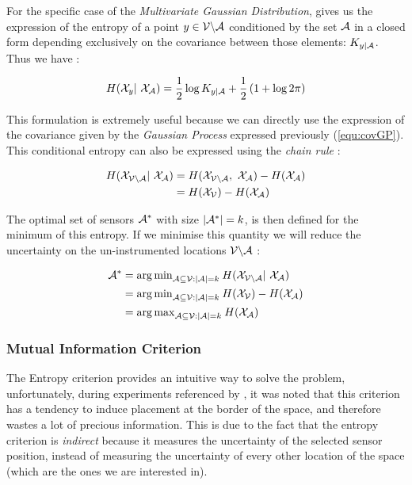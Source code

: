 For the specific case of the \textit{Multivariate Gaussian Distribution}, \citet{krause_near-optimal_2008} gives us the expression of the entropy of a point $y \in \mathcal{V} \backslash\mathcal{A}$ conditioned by the set $\mathcal{A}$ in a closed form depending exclusively on the covariance between those elements: $K_{y | \mathcal{A}}$. Thus we have :  

\begin{equation}
    H(\X_{y} | \X_\A) = \frac{1}{2} \log K_{y | \A} + \frac{1}{2} \left(1 + \log 2\pi  \right) \label{equ:entGP}
\end{equation}

This formulation is extremely useful because we can directly use the expression of the covariance given by the \textit{Gaussian Process} expressed previously (\ref{equ:covGP}). \\


This conditional entropy can also be expressed using the \textit{chain rule}  \citep[p.~16]{cover_elements_1991} : 

\begin{align}
    H(\X_{\VA} | \X_\A) &= H(\X_{\VA} ,  \X_\A) -  H(\X_{\A}) \\
    &= H(\X_{\V}) -  H(\X_{\A}) 
\label{equ:chainentropy}
\end{align}

The optimal set of sensors $\mathcal{A}^*$ with size $|\mathcal{A}^*| = k$, is then defined for the minimum of this entropy. If we minimise this quantity we will reduce the uncertainty on the un-instrumented locations $\mathcal{V} \backslash\mathcal{A}$ : 

\begin{align}
    \A^* &= {\arg\min}_{\A \subseteq \V : |\A| = k } \: H(\X_{\VA} | \X_\A) \\
     &= {\arg\min}_{\A \subseteq \V : |\A| = k }\:  H(\X_\V) -  H(\X_{\A}) \\
     &= {\arg\max}_{\A \subseteq \V : |\A| = k }\:  H(\X_{\A}) 
\end{align}


\subsubsection{Mutual Information Criterion}

The Entropy criterion provides an intuitive way to solve the problem, unfortunately, during experiments referenced by \citet{krause_near-optimal_2008}, it was noted that this criterion has a tendency to induce placement at the border of the space, and therefore wastes a lot of precious information. This is due to the fact that the entropy criterion is \textit{indirect} because it measures the uncertainty of the selected sensor position, instead of measuring the uncertainty of every other location of the space (which are the ones we are interested in). \\

